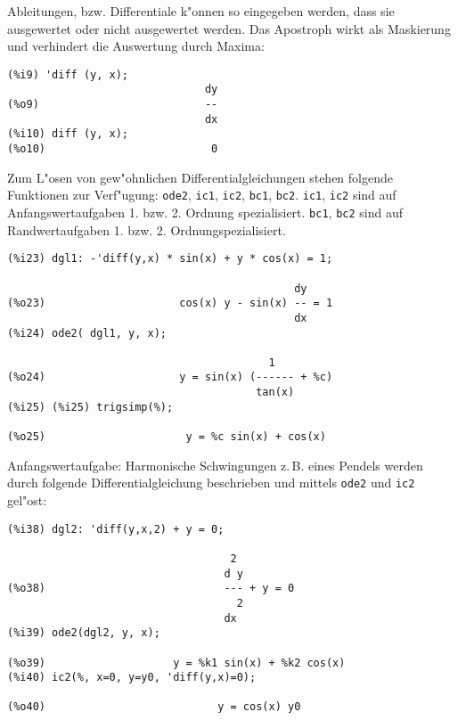 \documentclass[ngerman,12pt,a4paper]{article}
\begin{document}
Ableitungen, bzw. Differentiale k"onnen so eingegeben werden, dass sie ausgewertet oder nicht ausgewertet werden. Das Apostroph wirkt als Maskierung und verhindert die Auswertung durch Maxima:

\scriptsize
\begin{verbatim}
(%i9) 'diff (y, x);
                               dy
(%o9)                          --
                               dx
(%i10) diff (y, x);
(%o10)                          0
\end{verbatim}
\normalsize

Zum L"osen von gew"ohnlichen Differentialgleichungen stehen folgende
Funktionen zur Verf"ugung: \verb|ode2|, \verb|ic1|, \verb|ic2|, \verb|bc1|, \verb|bc2|.
\verb|ic1|, \verb|ic2| sind auf Anfangswertaufgaben 1. bzw. 2. Ordnung spezialisiert.
\verb|bc1|, \verb|bc2| sind auf Randwertaufgaben 1. bzw. 2. Ordnungspezialisiert.

\scriptsize
\begin{verbatim}
(%i23) dgl1: -'diff(y,x) * sin(x) + y * cos(x) = 1;

                                             dy
(%o23)                     cos(x) y - sin(x) -- = 1
                                             dx
(%i24) ode2( dgl1, y, x);

                                         1
(%o24)                     y = sin(x) (------ + %c)
                                       tan(x)
(%i25) (%i25) trigsimp(%);

(%o25)                      y = %c sin(x) + cos(x)
\end{verbatim}
\normalsize

Anfangswertaufgabe: Harmonische Schwingungen z.\,B. eines Pendels
werden durch folgende Differentialgleichung beschrieben und mittels
\verb|ode2| und \verb|ic2| gel"ost:

\scriptsize
\begin{verbatim}
(%i38) dgl2: 'diff(y,x,2) + y = 0;

                                   2
                                  d y
(%o38)                            --- + y = 0
                                    2
                                  dx
(%i39) ode2(dgl2, y, x);

(%o39)                    y = %k1 sin(x) + %k2 cos(x)
(%i40) ic2(%, x=0, y=y0, 'diff(y,x)=0);

(%o40)                           y = cos(x) y0
\end{verbatim}
\normalsize
\end{document}
